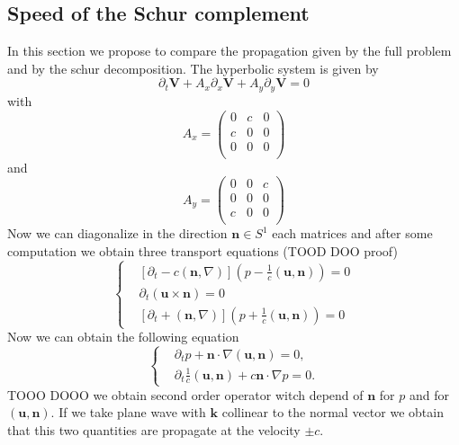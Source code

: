 \documentclass[a4paper, 11pt]{report}
\begin{document}
\subsection{Speed of the Schur complement}
In this section we propose to compare the propagation given by the full problem and by the schur decomposition.
The hyperbolic system is given by
$$
\partial_t \mathbf{V}+A_x\partial_x \mathbf{V}+A_y\partial_y \mathbf{V}=0
$$
with 
\begin{equation*}
A_x=\begin{pmatrix}
0 & c&0\\
c & 0&0\\
0 & 0 &0\\
\end{pmatrix}
\end{equation*}
and 
\begin{equation*}
A_y=\begin{pmatrix}
0 & 0&c\\
0 & 0&0\\
c & 0 &0\\
\end{pmatrix}
\end{equation*}
Now we can diagonalize in the direction $\mathbf{n}\in S^1$ each matrices and after some computation we obtain three transport equations (TOOD DOO proof)
$$
\left\{
\begin{split}
&\left[\partial_t-c (\mathbf{n},\nabla)\right]\left(p-\frac{1}{c}(\boldsymbol{u},\boldsymbol{n})\right)=0\\
&\partial_t \left(\boldsymbol{u}\times \boldsymbol{n}\right)=0 \\
&\left[\partial_t+(\mathbf{n},\nabla)\right]\left(p+\frac{1}{c}(\boldsymbol{u},\boldsymbol{n})\right)=0
\end{split}
\right.
$$
Now we can obtain the following equation
\begin{equation*}
\left\{\begin{split}
&\partial_t p+ \mathbf{n}\cdot\nabla (\boldsymbol{u},\boldsymbol{n})=0,\\
&\partial_t  \frac{1}{c}(\boldsymbol{u},\boldsymbol{n}) +c \mathbf{n} \cdot \nabla p=0.
\end{split}
\right.
\end{equation*}
TOOO DOOO
we obtain second order operator witch depend of $\mathbf{n}$ for $p$ and for $(\mathbf{u},\mathbf{n})$. If we take plane wave with 
$\mathbf{k}$ collinear to the normal vector we obtain that this two quantities are propagate at the velocity $\pm c$.
\end{document}
